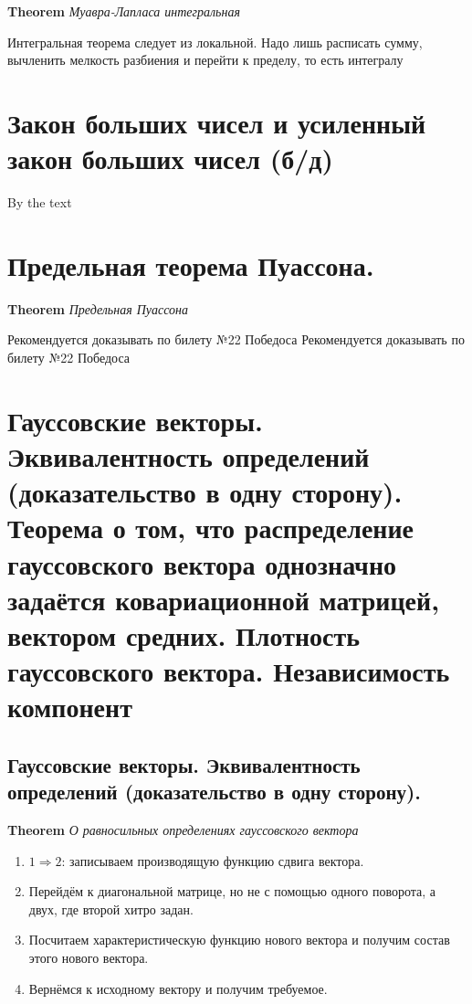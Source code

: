 \documentclass[a4paper, 14pt]{article}
\begin{document}
    \textbf{Theorem} \textit{Муавра-Лапласа интегральная}
    
    Интегральная теорема следует из локальной.
    Надо лишь расписать сумму, вычленить мелкость разбиения и перейти к пределу, то есть интегралу
    
    \section{Закон больших чисел и усиленный закон больших чисел (б/д)}
    
    By the text
    
    \section{Предельная теорема Пуассона.}
    
    \textbf{Theorem} \textit{Предельная Пуассона}
    
    Рекомендуется доказывать по билету №22 Победоса
    Рекомендуется доказывать по билету №22 Победоса
    
    \section{Гауссовские векторы. Эквивалентность определений (доказательство в одну сторону).
    Теорема о том, что распределение гауссовского вектора однозначно задаётся ковариационной матрицей, вектором средних.
    Плотность гауссовского вектора.
    Независимость компонент}
    
    \subsection{Гауссовские векторы. Эквивалентность определений (доказательство в одну сторону).}
    
    \textbf{Theorem} \textit{О равносильных определениях гауссовского вектора}
    
    \begin{enumerate}
        \item $1 \Rightarrow 2$: записываем производящую функцию сдвига вектора.
        \item Перейдём к диагональной матрице, но не с помощью одного поворота, а двух, где второй хитро задан.
        \item Посчитаем характеристическую функцию нового вектора и получим состав этого нового вектора.
        \item Вернёмся к исходному вектору и получим требуемое.
    \end{enumerate}
    
\end{document}
